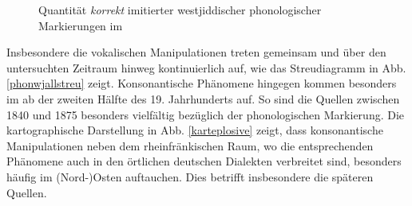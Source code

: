  
\begin{figure}[h!]
	\caption{Quantität \textit{korrekt} imitierter westjiddischer phonologischer Markierungen im }
	\label{phonwjall}	
\end{figure}
\FloatBarrier
 

Insbesondere die vokalischen Manipulationen treten gemeinsam und über den untersuchten Zeitraum hinweg kontinuierlich auf, wie das Streudiagramm in Abb. \ref{phonwjallstreu} zeigt. Konsonantische Phänomene hingegen kommen besonders im  ab der zweiten Hälfte des 19. Jahrhunderts auf. So sind die Quellen zwischen 1840 und 1875 besonders vielfältig bezüglich der phonologischen Markierung. Die kartographische Darstellung in Abb. \ref{karteplosive} zeigt, dass konsonantische Manipulationen neben dem rheinfränkischen Raum, wo die entsprechenden Phänomene auch in den örtlichen deutschen Dialekten verbreitet sind, besonders häufig im (Nord-)Osten auftauchen. Dies betrifft insbesondere die späteren Quellen. \\


